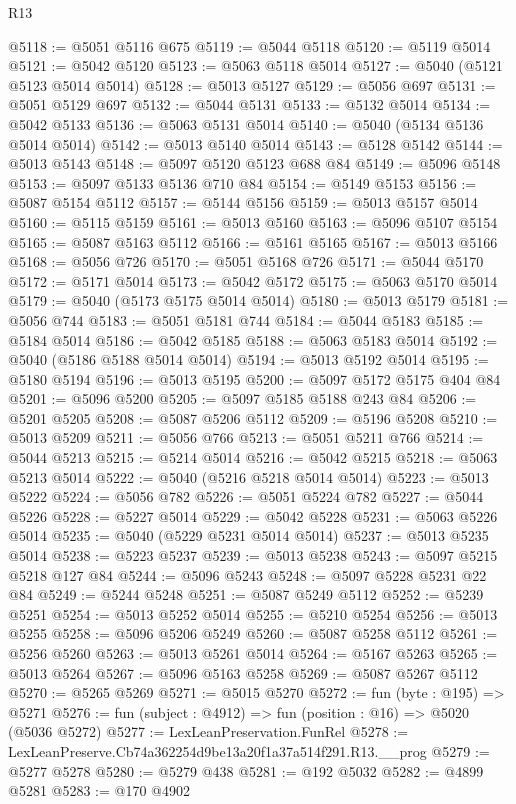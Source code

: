 \begin{lexlean}{R13}
\begin{coremodule}
@5118 := @5051 @5116 @675
@5119 := @5044 @5118
@5120 := @5119 @5014
@5121 := @5042 @5120
@5123 := @5063 @5118 @5014
@5127 := @5040 (@5121 @5123 @5014 @5014)
@5128 := @5013 @5127
@5129 := @5056 @697
@5131 := @5051 @5129 @697
@5132 := @5044 @5131
@5133 := @5132 @5014
@5134 := @5042 @5133
@5136 := @5063 @5131 @5014
@5140 := @5040 (@5134 @5136 @5014 @5014)
@5142 := @5013 @5140 @5014
@5143 := @5128 @5142
@5144 := @5013 @5143
@5148 := @5097 @5120 @5123 @688 @84
@5149 := @5096 @5148
@5153 := @5097 @5133 @5136 @710 @84
@5154 := @5149 @5153
@5156 := @5087 @5154 @5112
@5157 := @5144 @5156
@5159 := @5013 @5157 @5014
@5160 := @5115 @5159
@5161 := @5013 @5160
@5163 := @5096 @5107 @5154
@5165 := @5087 @5163 @5112
@5166 := @5161 @5165
@5167 := @5013 @5166
@5168 := @5056 @726
@5170 := @5051 @5168 @726
@5171 := @5044 @5170
@5172 := @5171 @5014
@5173 := @5042 @5172
@5175 := @5063 @5170 @5014
@5179 := @5040 (@5173 @5175 @5014 @5014)
@5180 := @5013 @5179
@5181 := @5056 @744
@5183 := @5051 @5181 @744
@5184 := @5044 @5183
@5185 := @5184 @5014
@5186 := @5042 @5185
@5188 := @5063 @5183 @5014
@5192 := @5040 (@5186 @5188 @5014 @5014)
@5194 := @5013 @5192 @5014
@5195 := @5180 @5194
@5196 := @5013 @5195
@5200 := @5097 @5172 @5175 @404 @84
@5201 := @5096 @5200
@5205 := @5097 @5185 @5188 @243 @84
@5206 := @5201 @5205
@5208 := @5087 @5206 @5112
@5209 := @5196 @5208
@5210 := @5013 @5209
@5211 := @5056 @766
@5213 := @5051 @5211 @766
@5214 := @5044 @5213
@5215 := @5214 @5014
@5216 := @5042 @5215
@5218 := @5063 @5213 @5014
@5222 := @5040 (@5216 @5218 @5014 @5014)
@5223 := @5013 @5222
@5224 := @5056 @782
@5226 := @5051 @5224 @782
@5227 := @5044 @5226
@5228 := @5227 @5014
@5229 := @5042 @5228
@5231 := @5063 @5226 @5014
@5235 := @5040 (@5229 @5231 @5014 @5014)
@5237 := @5013 @5235 @5014
@5238 := @5223 @5237
@5239 := @5013 @5238
@5243 := @5097 @5215 @5218 @127 @84
@5244 := @5096 @5243
@5248 := @5097 @5228 @5231 @22 @84
@5249 := @5244 @5248
@5251 := @5087 @5249 @5112
@5252 := @5239 @5251
@5254 := @5013 @5252 @5014
@5255 := @5210 @5254
@5256 := @5013 @5255
@5258 := @5096 @5206 @5249
@5260 := @5087 @5258 @5112
@5261 := @5256 @5260
@5263 := @5013 @5261 @5014
@5264 := @5167 @5263
@5265 := @5013 @5264
@5267 := @5096 @5163 @5258
@5269 := @5087 @5267 @5112
@5270 := @5265 @5269
@5271 := @5015 @5270
@5272 := fun (byte : @195) => @5271
@5276 := fun (subject : @4912) => fun (position : @16) => @5020 (@5036 @5272)
@5277 := LexLeanPreservation.FunRel
@5278 := LexLeanPreserve.Cb74a362254d9be13a20f1a37a514f291.R13.__prog
@5279 := @5277 @5278
@5280 := @5279 @438
@5281 := @192 @5032
@5282 := @4899 @5281
@5283 := @170 @4902

\end{coremodule}
\end{lexlean}
